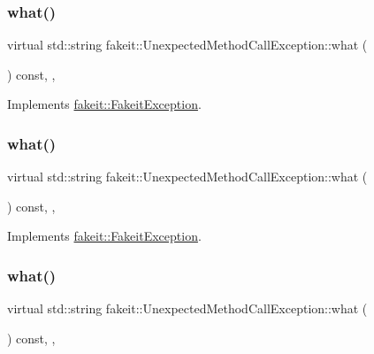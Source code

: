 \subsubsection{\texorpdfstring{what()}{what()}\hspace{0.1cm}{\footnotesize\ttfamily [2/9]}}
{\footnotesize\ttfamily virtual std\+::string fakeit\+::\+Unexpected\+Method\+Call\+Exception\+::what (\begin{DoxyParamCaption}{ }\end{DoxyParamCaption}) const\hspace{0.3cm}{\ttfamily [inline]}, {\ttfamily [override]}, {\ttfamily [virtual]}}



Implements \mbox{\hyperlink{structfakeit_1_1FakeitException_a02ef6315b98e4382157c2106a62f7718}{fakeit\+::\+Fakeit\+Exception}}.

\mbox{\label{structfakeit_1_1UnexpectedMethodCallException_aabd833b1856e1cf842d2eafc3abf0a0e}} 
\subsubsection{\texorpdfstring{what()}{what()}\hspace{0.1cm}{\footnotesize\ttfamily [3/9]}}
{\footnotesize\ttfamily virtual std\+::string fakeit\+::\+Unexpected\+Method\+Call\+Exception\+::what (\begin{DoxyParamCaption}{ }\end{DoxyParamCaption}) const\hspace{0.3cm}{\ttfamily [inline]}, {\ttfamily [override]}, {\ttfamily [virtual]}}



Implements \mbox{\hyperlink{structfakeit_1_1FakeitException_a02ef6315b98e4382157c2106a62f7718}{fakeit\+::\+Fakeit\+Exception}}.

\mbox{\label{structfakeit_1_1UnexpectedMethodCallException_aabd833b1856e1cf842d2eafc3abf0a0e}} 
\subsubsection{\texorpdfstring{what()}{what()}\hspace{0.1cm}{\footnotesize\ttfamily [4/9]}}
{\footnotesize\ttfamily virtual std\+::string fakeit\+::\+Unexpected\+Method\+Call\+Exception\+::what (\begin{DoxyParamCaption}{ }\end{DoxyParamCaption}) const\hspace{0.3cm}{\ttfamily [inline]}, {\ttfamily [override]}, {\ttfamily [virtual]}}



